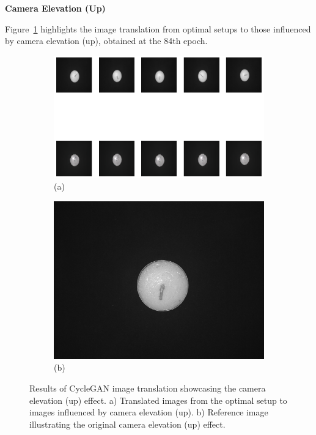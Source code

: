 \documentclass[12pt,DIV14,BCOR12mm,a4paper,footinclude=false,headinclude,parskip=half-,twoside,openright,cleardoublepage=empty,toc=index,bibliography=totoc,listof=totoc]{scrreprt}
\numberwithin{equation}{chapter}
\begin{document}
\textbf{Camera Elevation (Up)}

Figure~\ref{fig:camera_elevation_up_result} highlights the image translation from optimal setups to those influenced by camera elevation (up), obtained at the 84th epoch. 

\begin{figure}
    \centering
    \begin{subfigure}[b]{1.0\textwidth}
        \centering
        \includegraphics[width=\textwidth]{../media/candles_dark.png}
        \caption*{(a)}
    \end{subfigure}
    \hfill
    \begin{subfigure}[b]{0.25\textwidth}
        \centering
        \includegraphics[width=\textwidth]{../media/candles_dark_real.png}
        \caption*{(b)}
    \end{subfigure}
    \caption{Results of CycleGAN image translation showcasing the camera elevation (up) effect. a) Translated images from the optimal setup to images influenced by camera elevation (up). b) Reference image illustrating the original camera elevation (up) effect.}
    \label{fig:camera_elevation_up_result}
\end{figure}
\end{document}

